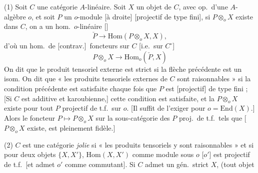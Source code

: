 \documentclass[11pt,a4paper]{article}
\begin{document}
(1) Soit $C$ une catégorie $A$-linéaire. Soit \struck{\ill{}} $X$ un objet
de $C$, avec op.\ d'une $A$-algèbre $o$, et soit $P$ un $o$-module
[à droite] [projectif de type fini], si $P \otimes_{o} X$ existe
dans $C$, on a un hom.\ $o$-linéaire []
\[
  \check{P} \longrightarrow \mathrm{Hom}(P \otimes_{o} X, X) ,
\]
d'où un hom.\ de [contrav.]\ foncteurs \struck{\ill{}} sur $C$ [i.e.\ sur
$C^{\circ}$]
\[
  P \otimes_{o} X \longrightarrow \mathrm{Hom}_{o}(\check{P}, X)
\]
On dit que le produit tensoriel externe est strict si la flèche précédente
est un isom. On dit que  « les produits tensoriels
externes de $C$ sont raisonnables » si la condition précédente est
satisfaite chaque fois que $P$ est  [projectif] de type
fini ;  [Si $C$ est additive et karoubienne,]
  cette condition est satisfaite, et
la $P \otimes_{o} X$ existe pour tout $P$ projectif de t.f.\ sur $o$.
[Il  suffit de l'exiger pour $o = \mathrm{End}(X)$.]
Alors le foncteur $P \longmapsto P \otimes_{o} X$ sur la sous-catégorie des
$P$ proj.\ de t.f.\ tels que [$P \otimes_{o} X$ existe, est pleinement
fidèle.]

(2) $C$ est une catégorie 
\struck{\ill{}} \emph{jolie} si  « les produits tensoriels y sont raisonnables » et si pour
deux objets $\{X, X'\}$, $\mathrm{Hom}(X, X')$ comme 
module sous $o$ [$o'$]  est projectif
de t.f.\ [et admet $o'$ comme commutant]. Si $C$ admet un gén.\ strict $X$,
(tout objet
\end{document}
